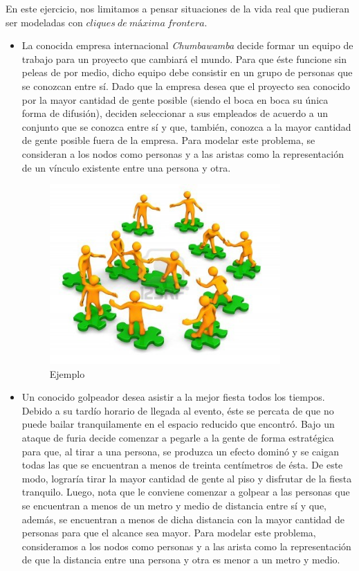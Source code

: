 En este ejercicio, nos limitamos a pensar situaciones de la vida real que pudieran ser modeladas con $cliques\ de\ máxima\ frontera$.
\begin{itemize}

\item La conocida empresa internacional \textit{Chumbawamba} decide formar un equipo de trabajo para un proyecto que cambiará el mundo. Para que éste funcione sin peleas de por medio, dicho equipo debe consistir en un grupo de personas que se conozcan entre sí. Dado que la empresa desea que el proyecto sea conocido por la mayor cantidad de gente posible (siendo el boca en boca su única forma de difusión), deciden seleccionar a sus empleados de acuerdo a un conjunto que se conozca entre sí y que, también, conozca a la mayor cantidad de gente posible fuera de la empresa. Para modelar este problema, se consideran a los nodos como personas y a las aristas como la representación de un vínculo existente entre una persona y otra.
\begin{figure}[H] %
\begin{center}
\includegraphics[width=250pt]{../imgs/ej1ejemp1.jpg}
\caption{Ejemplo}
\end{center}
\end{figure}

\item Un conocido golpeador desea asistir a la mejor fiesta todos los tiempos. Debido a su tardío horario de llegada al evento, éste se percata de que no puede bailar tranquilamente en el espacio reducido que encontró. Bajo un ataque de furia decide comenzar a pegarle a la gente de forma estratégica para que, al tirar a una persona, se produzca un efecto dominó y se caigan todas las que se encuentran a menos de treinta centímetros de ésta. De este modo, lograría tirar la mayor cantidad de gente al piso y disfrutar de la fiesta tranquilo. Luego, nota que le conviene comenzar a golpear a las personas que se encuentran a menos de un metro y medio de distancia entre sí y que, además, se encuentran a menos de dicha distancia con la mayor cantidad de personas para que el alcance sea mayor. Para modelar este problema, consideramos a los nodos como personas y a las arista como la representación de que la distancia entre una persona y otra es menor a un metro y medio.  


\end{itemize}

